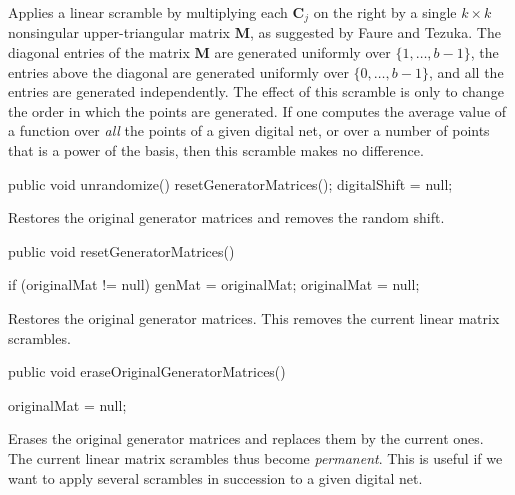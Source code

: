  \begin{tabb}
   Applies a linear scramble by multiplying each $\mathbf{C}_j$ on the right
   by a single $k\times k$ nonsingular upper-triangular matrix $\mathbf{M}$,
   as suggested by Faure and Tezuka.
   The diagonal entries of the matrix $\mathbf{M}$ are generated uniformly over
   $\{1,\dots,b-1\}$, the entries above the diagonal are generated uniformly
   over $\{0,\dots,b-1\}$, and all the entries are generated independently.
   The effect of this scramble is only to change the order in which the
   points are generated.  If one computes the average value of a
   function over \emph{all} the points of a given digital net, or over
   a number of points that is a power of the basis, then this
   scramble makes no difference.
\end{tabb}
\begin{htmlonly}
\end{htmlonly}
\begin{hide} %
\begin{code}

   public void unrandomize() {
      resetGeneratorMatrices();
      digitalShift = null;
   }
\end{code}
\begin{tabb}
   Restores the original generator matrices and
   removes the random shift.
\end{tabb}
\end{hide}
\begin{code}

   public void resetGeneratorMatrices()\begin{hide} {
      if (originalMat != null) {
         genMat = originalMat;
         originalMat = null;
      }
   }\end{hide}
\end{code}
\begin{tabb}
   Restores the original generator matrices.
   This removes the current linear matrix scrambles.
\end{tabb}
\begin{code}

   public void eraseOriginalGeneratorMatrices()\begin{hide} {
      originalMat = null;
   }\end{hide}
\end{code}
\begin{tabb}
   Erases the original generator matrices and replaces them by
   the current ones.  The current linear matrix scrambles thus become
   \emph{permanent}.  This is useful if we want to apply several
   scrambles in succession to a given digital net.
\end{tabb}
